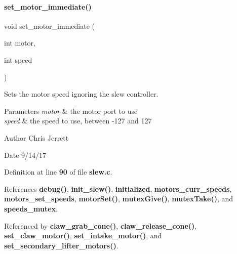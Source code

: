 \paragraph{set\+\_\+motor\+\_\+immediate()}
{\footnotesize\ttfamily void set\+\_\+motor\+\_\+immediate (\begin{DoxyParamCaption}\item[{int}]{motor,  }\item[{int}]{speed }\end{DoxyParamCaption})}



Sets the motor speed ignoring the slew controller. 


\begin{DoxyParams}{Parameters}
{\em motor} & the motor port to use \\
\hline
{\em speed} & the speed to use, between -\/127 and 127 \\
\hline
\end{DoxyParams}
\begin{DoxyAuthor}{Author}
Chris Jerrett 
\end{DoxyAuthor}
\begin{DoxyDate}{Date}
9/14/17 
\end{DoxyDate}


Definition at line \textbf{ 90} of file \textbf{ slew.\+c}.



References \textbf{ debug()}, \textbf{ init\+\_\+slew()}, \textbf{ initialized}, \textbf{ motors\+\_\+curr\+\_\+speeds}, \textbf{ motors\+\_\+set\+\_\+speeds}, \textbf{ motor\+Set()}, \textbf{ mutex\+Give()}, \textbf{ mutex\+Take()}, and \textbf{ speeds\+\_\+mutex}.



Referenced by \textbf{ claw\+\_\+grab\+\_\+cone()}, \textbf{ claw\+\_\+release\+\_\+cone()}, \textbf{ set\+\_\+claw\+\_\+motor()}, \textbf{ set\+\_\+intake\+\_\+motor()}, and \textbf{ set\+\_\+secondary\+\_\+lifter\+\_\+motors()}.


